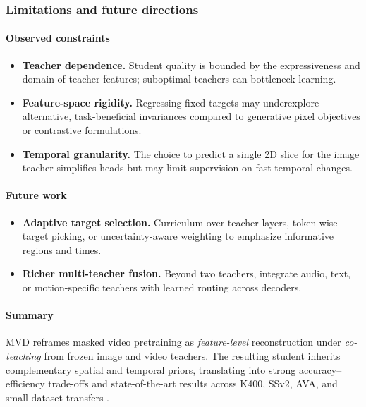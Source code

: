 \begin{enrichment}
\begin{enrichment}
            \subsubsection{Limitations and future directions}
            \label{subsubsec:chapter24_mvd_limits}
            \paragraph{Observed constraints}
            \begin{itemize}
                \item \textbf{Teacher dependence.} Student quality is bounded by the expressiveness and domain of teacher features; suboptimal teachers can bottleneck learning.
                \item \textbf{Feature-space rigidity.} Regressing fixed targets may underexplore alternative, task-beneficial invariances compared to generative pixel objectives or contrastive formulations.
                \item \textbf{Temporal granularity.} The choice to predict a single 2D slice for the image teacher simplifies heads but may limit supervision on fast temporal changes.
            \end{itemize}
            
            \paragraph{Future work}
            \begin{itemize}
                \item \textbf{Adaptive target selection.} Curriculum over teacher layers, token-wise target picking, or uncertainty-aware weighting to emphasize informative regions and times.
                \item \textbf{Richer multi-teacher fusion.} Beyond two teachers, integrate audio, text, or motion-specific teachers with learned routing across decoders.
            \end{itemize}
            
            \paragraph{Summary}
            MVD reframes masked video pretraining as \emph{feature-level} reconstruction under \emph{co-teaching} from frozen image and video teachers. The resulting student inherits complementary spatial and temporal priors, translating into strong accuracy–efficiency trade-offs and state-of-the-art results across K400, SSv2, AVA, and small-dataset transfers \cite{wang2023_mvd,tong2022_videomae}.
        
    \end{enrichment}
    
\end{enrichment}

